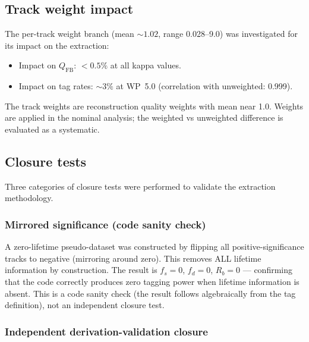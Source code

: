 \documentclass[11pt,a4paper]{article}
\begin{document}
\subsection{Track weight impact}
\label{sec:xcheck_weights}

The per-track weight branch (mean $\sim 1.02$, range 0.028--9.0) was investigated for
its impact on the extraction:
\begin{itemize}
\item Impact on $Q_\mathrm{FB}$: $< 0.5\%$ at all kappa values.
\item Impact on tag rates: $\sim 3\%$ at WP~5.0 (correlation with unweighted: 0.999).
\end{itemize}
The track weights are reconstruction quality weights with mean near 1.0. Weights are
applied in the nominal analysis; the weighted vs unweighted difference is evaluated as
a systematic.

\subsection{Closure tests}
\label{sec:xcheck_closure}

Three categories of closure tests were performed to validate the extraction methodology.

\subsubsection{Mirrored significance (code sanity check)}

A zero-lifetime pseudo-dataset was constructed by flipping all positive-significance
tracks to negative (mirroring around zero). This removes ALL lifetime information by
construction. The result is $f_s = 0$, $f_d = 0$, $R_b = 0$ --- confirming that the
code correctly produces zero tagging power when lifetime information is absent. This is a
code sanity check (the result follows algebraically from the tag definition), not an
independent closure test.

\subsubsection{Independent derivation-validation closure}
\end{document}
